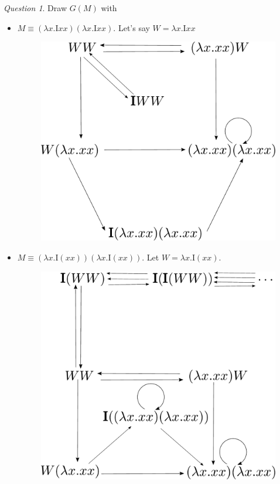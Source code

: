 \documentclass[11pt]{article}
\theoremstyle{definition}
\theoremstyle{remark}
\theoremstyle{remark}
\newtheorem{question}{Question}
\theoremstyle{definition}
\newcommand{\I}{\pmb{\mathrm{I}}}
\begin{document}
\begin{question}
  Draw $G(M)$ with
  \begin{itemize}
    \item $M \equiv (\lambda x. \I xx)(\lambda x. \I xx)$. Let's say
          $W = \lambda x. \I xx$
          \begin{figure}[H]
            \centering
            \includegraphics[scale=0.4]{../graphs/exercise-3-5-1-i.pdf}
          \end{figure}

    \item $M \equiv (\lambda x. \I (xx))(\lambda x. \I (xx))$. Let
          $W = \lambda x. \I (xx)$.
          \begin{figure}[H]
            \centering
            \includegraphics[scale=0.4]{../graphs/exercise-3-5-1-ii.pdf}
          \end{figure}
  \end{itemize}
\end{question}
\end{document}
